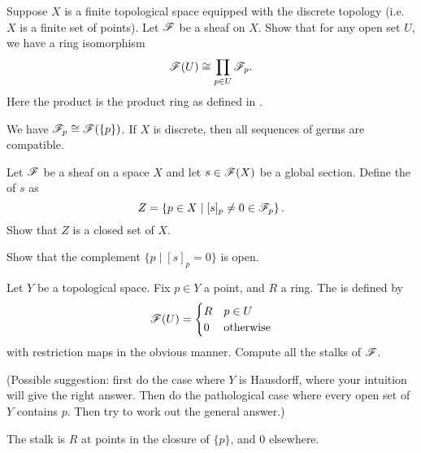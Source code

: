 \begin{problem}
	\label{prob:finite_sheaf}
	Suppose $X$ is a finite topological space equipped with the discrete topology
	(i.e.\ $X$ is a finite set of points).
	Let $\mathscr F$ be a sheaf on $X$.
	Show that for any open set $U$, we have a ring isomorphism
	\[ \mathscr F(U) \cong \prod_{p \in U} \mathscr F_p. \]
	Here the product is the product ring as defined in .
	\begin{hint}
		We have $\mathscr F_p \cong \mathscr F(\{p\})$.
		If $X$ is discrete, then all sequences of germs are compatible.
	\end{hint}
\end{problem}

\begin{problem}
	Let $\mathscr F$ be a sheaf on a space $X$ and let $s \in \mathscr F(X)$
	be a global section.
	Define the  of $s$ as
	\[ Z = \left\{ p \in X \mid [s]_p \neq 0 \in \mathscr F_p \right\}. \]
	Show that $Z$ is a closed set of $X$.
	\begin{hint}
		Show that the complement $\{ p \mid [s]_p = 0 \}$ is open.
	\end{hint}
\end{problem}

\begin{problem}
	Let $Y$ be a topological space.
	Fix $p \in Y$ a point, and $R$ a ring.
	The  is defined by
	\[
		\mathscr F(U) = \begin{cases}
			R & p \in U \\
			0 & \text{otherwise}
		\end{cases}
	\]
	with restriction maps in the obvious manner.
	Compute all the stalks of $\mathscr F$.

	(Possible suggestion: first do the case where $Y$ is Hausdorff,
	where your intuition will give the right answer.
	Then do the pathological case where every open set of $Y$ contains $p$.
	Then try to work out the general answer.)
	\begin{hint}
		The stalk is $R$ at points in the closure of $\{p\}$, and $0$ elsewhere.
	\end{hint}
\end{problem}

%

